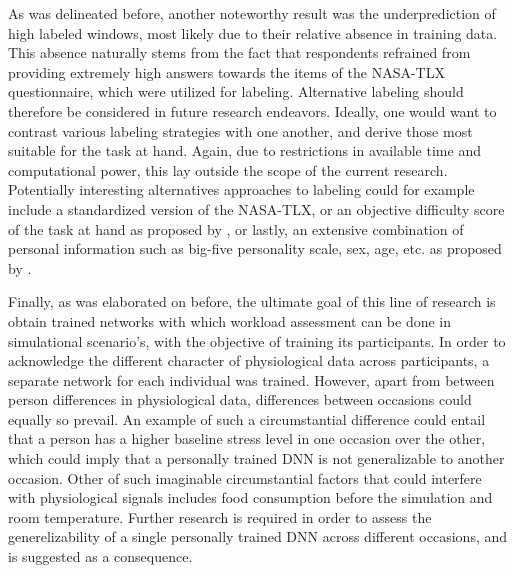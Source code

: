 \documentclass[12pt]{article}
\begin{document}
As was delineated before, another noteworthy result was the underprediction  of high labeled windows, most likely due to their relative absence in training data. This absence naturally stems from the fact that respondents refrained from providing extremely high answers towards the items of the NASA-TLX questionnaire, which were utilized for labeling. Alternative labeling should therefore be considered in future research endeavors. Ideally, one would want to contrast various labeling strategies with one another, and derive those most suitable for the task at hand. Again, due to restrictions in available time and computational power, this lay outside the scope of the current research. Potentially interesting alternatives approaches to labeling could for example include a standardized version of the NASA-TLX, or an objective difficulty score of the task at hand as proposed by , or lastly, an extensive combination of personal information such as big-five personality scale, sex, age, etc. as proposed by .

Finally, as was elaborated on before, the ultimate goal of this line of research is obtain trained networks with which workload assessment can be done in simulational scenario's, with the objective of training its participants. In order to acknowledge the different character of physiological data across participants, a separate network for each individual was trained.  However, apart from between person differences in physiological data, differences between occasions could equally so prevail. An example of such a circumstantial difference could entail that a person has a higher baseline stress level in one occasion over the other, which could imply that a personally trained DNN is not generalizable to another occasion.  Other of such imaginable circumstantial factors that could interfere with physiological signals includes food consumption before the simulation and room temperature.  Further research is required in order to assess the generelizability of a single personally trained DNN across different occasions, and is suggested as a consequence. 
\end{document}
